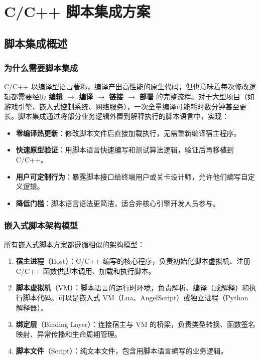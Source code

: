 \documentclass[12pt,a4paper,fontset=fandol]{ctexbook}
\begin{document}
\mainmatter

\part{C/C++ 脚本集成方案}

\chapter{脚本集成概述}\label{ch:overview}

\section{为什么需要脚本集成}\label{sec:why}

C/C++ 以编译型语言著称，编译产出高性能的原生代码，但也意味着每次修改逻辑都需要经历 \textbf{编辑 $\to$ 编译 $\to$ 链接 $\to$ 部署} 的完整流程。对于大型项目（如游戏引擎、嵌入式控制系统、网络服务），一次全量编译可能耗时数分钟甚至更长。脚本集成通过将部分业务逻辑外置到解释执行的脚本语言中，实现：

\begin{itemize}
  \item \textbf{零编译热更新}：修改脚本文件后直接加载执行，无需重新编译宿主程序。
  \item \textbf{快速原型验证}：用脚本语言快速编写和测试算法逻辑，验证后再移植到 C/C++。
  \item \textbf{用户可定制行为}：暴露脚本接口给终端用户或关卡设计师，允许他们编写自定义逻辑。
  \item \textbf{降低门槛}：脚本语言语法更简洁，适合非核心引擎开发人员参与。
\end{itemize}

\section{嵌入式脚本架构模型}\label{sec:arch}

所有嵌入式脚本方案都遵循相似的架构模型：

\begin{enumerate}
  \item \textbf{宿主进程}（Host）：C/C++ 编写的核心程序，负责初始化脚本虚拟机、注册 C/C++ 函数供脚本调用、加载和执行脚本。
  \item \textbf{脚本虚拟机}（VM）：脚本语言的运行时环境，负责解析、编译（或解释）和执行脚本代码。可以是嵌入式 VM（Lua、AngelScript）或独立进程（Python 解释器）。
  \item \textbf{绑定层}（Binding Layer）：连接宿主与 VM 的桥梁，负责类型转换、函数签名映射、异常传播和生命周期管理。
  \item \textbf{脚本文件}（Script）：纯文本文件，包含用脚本语言编写的业务逻辑。
\end{enumerate}
\end{document}
